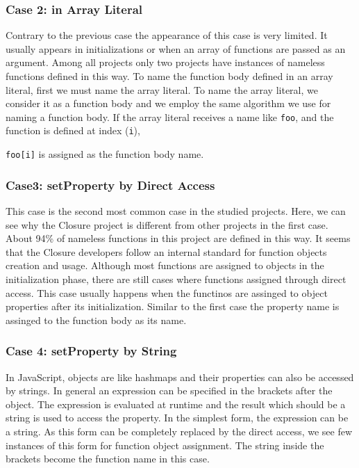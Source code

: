 \documentclass{acm_proc_article-sp}
\begin{document}
\subsubsection{Case 2: in Array Literal}
Contrary to the previous case the appearance of this case is very limited. It usually appears in initializations or when an array of functions are passed as an argument. Among all projects only two projects have instances of nameless functions defined in this way. To name the function body defined in an array literal, first we must name the array literal. To name the array literal, we consider it as a function body and we employ the same algorithm we use for naming a function body. If the array literal receives a name like {\small\texttt{foo}}, and the function is defined at index ({\small\texttt{i}}), {{\small\texttt{foo[i]}} is assigned as the function body name. 


\subsubsection{Case3: setProperty by Direct Access }
This case is the second most common case in the studied projects. Here, we can see why the Closure project is different from other projects in the first case. About 94\% of nameless functions in this project are defined in this way. It seems that the Closure developers follow an internal standard for function objects creation and usage. Although most functions are assigned to objects in the initialization phase, there are still cases where functions assigned through direct access. 
This case usually happens when the functinos are assinged to object properties after its initialization. Similar to the first case the property name is assinged to the function body as its name. 
 

\subsubsection{Case 4: setProperty by String}
In JavaScript, objects are like hashmaps and their properties can also be accessed by strings. In general an expression can be specified in the brackets after the object. The expression is evaluated at runtime and the result which should be a string is used to access the property. In the simplest form, the expression can be a string. As this form can be completely replaced by the direct access, we see few instances of this form for function object assignment. The string inside the brackets become the function name in this case.

}
\end{document}
